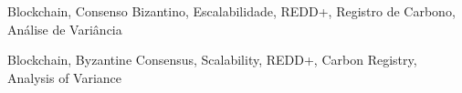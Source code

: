 \begin{pchaves}
Blockchain, Consenso Bizantino, Escalabilidade, REDD+, Registro de Carbono, Análise de Variância
\end{pchaves}

\begin{keywords}
Blockchain, Byzantine Consensus, Scalability, REDD+, Carbon Registry, Analysis of Variance
\end{keywords}
